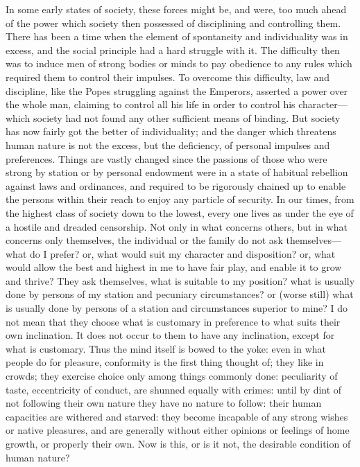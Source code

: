 \documentclass[11pt,openany]{book}
\begin{document}
In some early states of society, these forces might be, and were, too much ahead of the power which society then possessed of disciplining and controlling them. There has been a time when the element of spontaneity and individuality was in excess, and the social principle had a hard struggle with it. The difficulty then was to induce men of strong bodies or minds to pay obedience to any rules which required them to control their impulses. To overcome this difficulty, law and discipline, like the Popes struggling against the Emperors, asserted a power over the whole man, claiming to control all his life in order to control his character---which society had not found any other sufficient means of binding. But society has now fairly got the better of individuality; and the danger which threatens human nature is not the excess, but the deficiency, of personal impulses and preferences. Things are vastly changed since the passions of those who were strong by station or by personal endowment were in a state of habitual rebellion against laws and ordinances, and required to be rigorously chained up to enable the persons within their reach to enjoy any particle of security. In our times, from the highest class of society down to the lowest, every one lives as under the eye of a hostile and dreaded censorship. Not only in what concerns others, but in what concerns only themselves, the individual or the family do not ask themselves---what do I prefer? or, what would suit my character and disposition? or, what would allow the best and highest in me to have fair play, and enable it to grow and thrive? They ask themselves, what is suitable to my position? what is usually done by persons of my station and pecuniary circumstances? or (worse still) what is usually done by persons of a station and circumstances superior to mine? I do not mean that they choose what is customary in preference to what suits their own inclination. It does not occur to them to have any inclination, except for what is customary. Thus the mind itself is bowed to the yoke: even in what people do for pleasure, conformity is the first thing thought of; they like in crowds; they exercise choice only among things commonly done: peculiarity of taste, eccentricity of conduct, are shunned equally with crimes: until by dint of not following their own nature they have no nature to follow: their human capacities are withered and starved: they become incapable of any strong wishes or native pleasures, and are generally without either opinions or feelings of home growth, or properly their own. Now is this, or is it not, the desirable condition of human nature?
\end{document}
